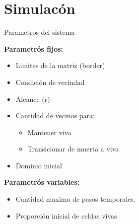 \section{Simulacón}
\begin{frame}{Parametros del sistema}
    \begin{minipage}[t]{0.45\linewidth}

        {\textbf{Parametrós fijos:}
        \begin{itemize}
            \item Limites de la matriz (border)
            \item Condición de vecindad
            \item Alcance (r)
            \item Cantidad de vecinos para:
            \begin{itemize}
                \item Mantener viva
                \item Transicionar de muerta a viva
            \end{itemize}
            \item Dominio inicial
        \end{itemize}}
    \end{minipage}
    \begin{minipage}[t]{0.45\linewidth}
        \textbf{Parametrós variables:}
        \begin{itemize}
            \item Cantidad maxima de pasos temporales.
            \item Proporción inicial de celdas vivas
        \end{itemize}

    \end{minipage}
\end{frame}

